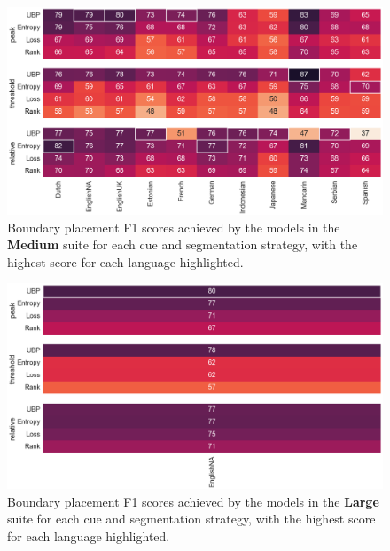 \begin{figure}
    \centering
    \includegraphics[width=0.99\linewidth]{Figures/15Segmentation/medium.png}
    \caption{Boundary placement F1 scores achieved by the models in the \textbf{Medium} suite for each cue and segmentation strategy, with the highest score for each language highlighted.}
    \label{fig:15-medium}
\end{figure}

\begin{figure}
    \centering
    \includegraphics[width=0.99\linewidth]{Figures/15Segmentation/large.png}
    \caption{Boundary placement F1 scores achieved by the models in the \textbf{Large} suite for each cue and segmentation strategy, with the highest score for each language highlighted.}
    \label{fig:15-large}
\end{figure}


